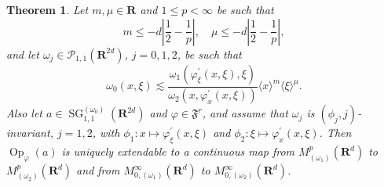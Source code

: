 \documentclass[12pt,a4paper,reqno]{amsart}
\numberwithin{equation}{section}
\newtheorem{thm}{Theorem}
\numberwithin{thm}{section}
\theoremstyle{definition}
\theoremstyle{remark}
\begin{document}
\par

\begin{thm}\label{FIOmodcont}
Let $m,\mu \in \mathbf R$ and $1\le p<\infty$ be such that
$$
m\le -d\left | \frac 12-\frac 1p  \right | ,\quad \mu \le -d\left | \frac 12-\frac 1p 
\right | ,
$$
and let $\omega _j\in {\mathscr P} _{1,1}({\mathbf R^{{2d}}})$, $j=0,1,2$, be such that
$$
\omega _0(x,\xi ) \lesssim \frac {\omega _1(\varphi^\prime_\xi(x,\xi),\xi )}{\omega
_2(x,\varphi^\prime_x(x,\xi) )}{\langle x\rangle}^m {\langle \xi\rangle} ^\mu.
$$
Also let $a\in {\operatorname{SG}} ^{(\omega _0)}_{1,1}({\mathbf R^{{2d}}})$ and ${\varphi}\in{\mathfrak{F}^r}$, and assume
that $\omega_j$ is $(\phi_j,j)$-invariant, $j=1,2$, with
$\phi_1\colon x\mapsto\varphi^\prime_\xi(x,\xi)$ 
and $\phi_2\colon\xi\mapsto\varphi^\prime_x(x,\xi)$.
Then ${\operatorname{Op}}_\varphi(a)$ is uniquely extendable to a continuous
map from $M^p_{(\omega _1)}({\mathbf R^{d}})$ to $M^p_{(\omega _2)}({\mathbf R^{d}})$ and from
$M^\infty _{0,(\omega _1)}({\mathbf R^{d}})$ to $M^\infty _{0,(\omega _2)}({\mathbf R^{d}})$.
\end{thm}

\par
\end{document}
